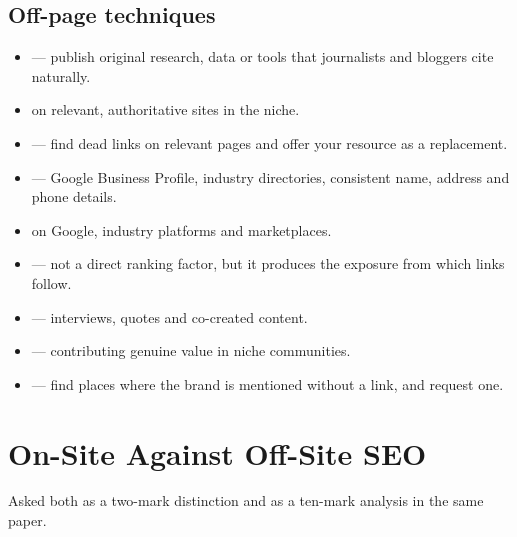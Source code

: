 \subsection{Off-page techniques}

\begin{itemize}
\item {} --- publish original research, data or
      tools that journalists and bloggers cite naturally.
\item {} on relevant, authoritative sites in the niche.
\item {} --- find dead links on relevant pages and offer
      your resource as a replacement.
\item {} --- Google Business Profile, industry
      directories, consistent name, address and phone details.
\item {} on Google, industry platforms and
      marketplaces.
\item {} --- not a direct ranking factor, but it produces
      the exposure from which links follow.
\item {} --- interviews, quotes and
      co-created content.
\item {} --- contributing genuine value in
      niche communities.
\item {} --- find places where the brand is
      mentioned without a link, and request one.
\end{itemize}

\section{On-Site Against Off-Site SEO}

\begin{keybox}
Asked both as a two-mark distinction and as a ten-mark analysis in the same
paper.
\end{keybox}

